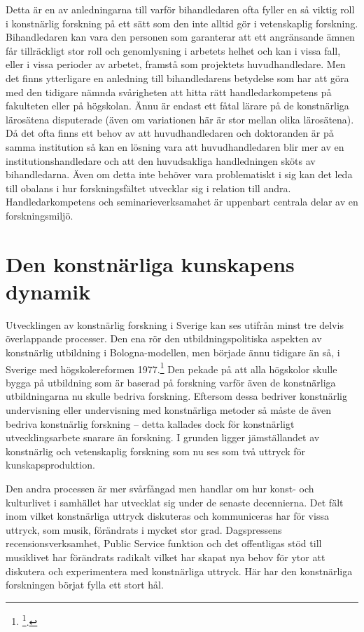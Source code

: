 \documentclass[11pt]{article}
\begin{document}
Detta är en av anledningarna till varför bihandledaren ofta fyller en så
viktig roll i konstnärlig forskning på ett sätt som den inte alltid gör
i vetenskaplig forskning. Bihandledaren kan vara den personen som
garanterar att ett angränsande ämnen får tillräckligt stor roll och
genomlysning i arbetets helhet och kan i vissa fall, eller i vissa
perioder av arbetet, framstå som projektets huvudhandledare. Men det
finns ytterligare en anledning till bihandledarens betydelse som har att
göra med den tidigare nämnda svårigheten att hitta rätt
handledarkompetens på fakulteten eller på högskolan. Ännu är endast ett
fåtal lärare på de konstnärliga lärosätena disputerade (även om
variationen här är stor mellan olika lärosätena). Då det ofta finns ett
behov av att huvudhandledaren och doktoranden är på samma institution så
kan en lösning vara att huvudhandledaren blir mer av en
institutionshandledare och att den huvudsakliga handledningen sköts av
bihandledarna. Även om detta inte behöver vara problematiskt i sig kan
det leda till obalans i hur forskningsfältet utvecklar sig i relation
till andra. Handledarkompetens och seminarieverksamahet är uppenbart
centrala delar av en forskningsmiljö.

\section{Den konstnärliga kunskapens dynamik}
\label{sec:org541db05}
Utvecklingen av konstnärlig forskning i Sverige kan ses utifrån minst
tre delvis överlappande processer. Den ena rör den utbildningspolitiska
aspekten av konstnärlig utbildning i Bologna-modellen, men började ännu
tidigare än så, i Sverige med högskolereformen 1977.\footnote{\footcite[Se t.ex. ][]{Lilja2015}.} Den pekade
på att alla högskolor skulle bygga på utbildning som är baserad på
forskning varför även de konstnärliga utbildningarna nu skulle bedriva
forskning. Eftersom dessa bedriver konstnärlig undervisning eller
undervisning med konstnärliga metoder så måste de även bedriva
konstnärlig forskning -- detta kallades dock för konstnärligt
utvecklingsarbete snarare än forskning. I grunden ligger jämställandet
av konstnärlig och vetenskaplig forskning som nu ses som två uttryck för
kunskapsproduktion.

Den andra processen är mer svårfångad men handlar om hur konst- och
kulturlivet i samhället har utvecklat sig under de senaste decennierna.
Det fält inom vilket konstnärliga uttryck diskuteras och kommuniceras
har för vissa uttryck, som musik, förändrats i mycket stor grad.
Dagspressens recensionsverksamhet, Public Service funktion och det
offentligas stöd till musiklivet har förändrats radikalt vilket har
skapat nya behov för ytor att diskutera och experimentera med
konstnärliga uttryck. Här har den konstnärliga forskningen börjat fylla
ett stort hål.
\end{document}

